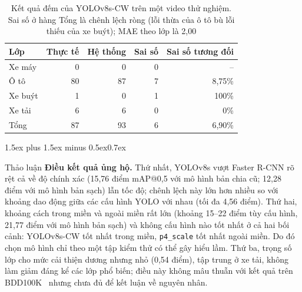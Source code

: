 \documentclass[10pt,journal,letterpaper]{IEEEtran}
\makeatletter
\renewcommand\section{\@startsection{section}{1}{\z@}%
  {1.5ex plus 1.5ex minus 0.5ex}{0.7ex}{\normalfont\scshape\raggedright}}
\makeatother
\begin{document}
\begin{table}[!t]
\caption{Kết quả đếm của YOLOv8s-CW trên một video thử nghiệm. Sai số ở hàng Tổng là chênh lệch ròng (lỗi thừa của ô tô bù lỗi thiếu của xe buýt); MAE theo lớp là 2,00}
\label{tab:cnt}
\centering
\footnotesize
\begin{tabular}{lrrrr}
\toprule
Lớp & Thực tế & Hệ thống & Sai số & Sai số tương đối \\
\midrule
Xe máy & 0 & 0 & 0 & -- \\
Ô tô & 80 & 87 & 7 & 8,75\% \\
Xe buýt & 1 & 0 & 1 & 100\% \\
Xe tải & 6 & 6 & 0 & 0\% \\
\midrule
Tổng & 87 & 93 & 6 & 6,90\% \\
\bottomrule
\end{tabular}
\end{table}

\section{Thảo luận}
\textbf{Điều kết quả ủng hộ.} Thứ nhất, YOLOv8s vượt Faster R-CNN rõ rệt cả về độ chính xác (15,76 điểm mAP@0,5 với mô hình bản chia cũ; 12,28 điểm với mô hình bản sạch) lẫn tốc độ; chênh lệch này lớn hơn nhiều so với khoảng dao động giữa các cấu hình YOLO với nhau (tối đa 4,56 điểm). Thứ hai, khoảng cách trong miền và ngoài miền rất lớn (khoảng 15--22 điểm tùy cấu hình, 21,77 điểm với mô hình bản sạch) và không cấu hình nào tốt nhất ở cả hai bối cảnh: YOLOv8s-CW tốt nhất trong miền, \texttt{p4\_scale} tốt nhất ngoài miền. Do đó chọn mô hình chỉ theo một tập kiểm thử có thể gây hiểu lầm. Thứ ba, trọng số lớp cho mức cải thiện dương nhưng nhỏ (0,54 điểm), tập trung ở xe tải, không làm giảm đáng kể các lớp phổ biến; điều này không mâu thuẫn với kết quả trên BDD100K~\cite{phan} nhưng chưa đủ để kết luận về nguyên nhân.
\end{document}
